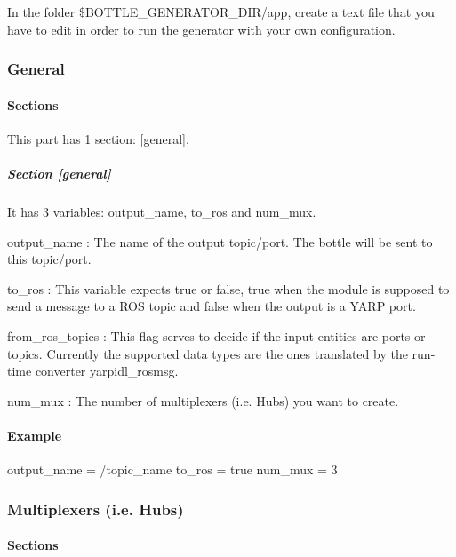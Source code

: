In the folder {\ttfamily \$\-B\-O\-T\-T\-L\-E\-\_\-\-G\-E\-N\-E\-R\-A\-T\-O\-R\-\_\-\-D\-I\-R/app}, create a text file that you have to edit in order to run the generator with your own configuration.

\subsubsection*{General}

\paragraph*{Sections}

This part has 1 section\-: {\ttfamily \mbox{[}general\mbox{]}}.

\subparagraph*{Section \mbox{[}general\mbox{]}}

It has 3 variables\-: {\ttfamily output\-\_\-name}, {\ttfamily to\-\_\-ros} and {\ttfamily num\-\_\-mux}.

{\ttfamily output\-\_\-name} \-: The name of the output topic/port. The bottle will be sent to this topic/port.

{\ttfamily to\-\_\-ros} \-: This variable expects true or false, true when the module is supposed to send a message to a R\-O\-S topic and false when the output is a Y\-A\-R\-P port.

{\ttfamily from\-\_\-ros\-\_\-topics} \-: This flag serves to decide if the input entities are ports or topics. Currently the supported data types are the ones translated by the run-\/time converter {\ttfamily yarpidl\-\_\-rosmsg}.

{\ttfamily num\-\_\-mux} \-: The number of multiplexers (i.\-e. Hubs) you want to create.

\paragraph*{Example}

\begin{DoxyVerb}[general]
output_name = /topic_name
to_ros = true
num_mux = 3
\end{DoxyVerb}


\subsubsection*{Multiplexers (i.\-e. Hubs)}

\paragraph*{Sections}

